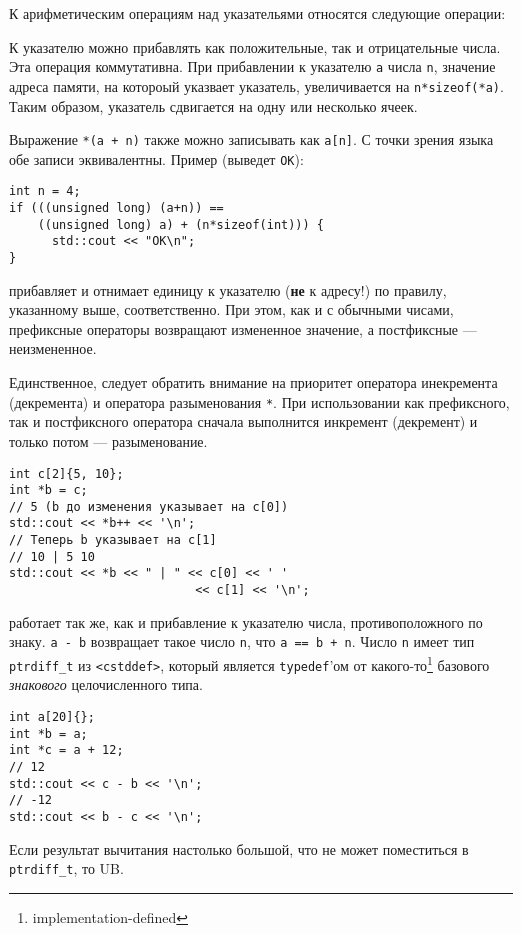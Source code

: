 \documentclass[14pt, a4paper]{extarticle}
\begin{document}
К арифметическим операциям над указательями относятся следующие операции:
\begin{enumerate}
   К указателю можно прибавлять как положительные,
  так и отрицательные числа. Эта операция коммутативна. При прибавлении к указателю
  \verb|a| числа \verb|n|, значение адреса памяти, на котороый указвает указатель,
  увеличивается на \verb|n*sizeof(*a)|. Таким образом, указатель сдвигается на одну или
  несколько ячеек.

  Выражение \verb|*(a + n)| также можно записывать как \verb|a[n]|.
  С точки зрения языка обе записи эквивалентны.
  Пример (выведет \verb|OK|):
\begin{verbatim}
int n = 4;
if (((unsigned long) (a+n)) ==
    ((unsigned long) a) + (n*sizeof(int))) {
      std::cout << "OK\n";
}
\end{verbatim}

   прибавляет и отнимает единицу к указателю (\textbf{не} к адресу!) по правилу, указанному
  выше, соответственно. При этом, как и с обычными чисами, префиксные операторы возвращают измененное
  значение, а постфиксные --- неизмененное.

  Единственное, следует обратить внимание на приоритет оператора инекремента (декремента)
  и оператора разыменования \verb|*|. При использовании как префиксного, так и постфиксного
  оператора сначала выполнится инкремент (декремент) и только потом --- разыменование.
\begin{verbatim}
int c[2]{5, 10};
int *b = c;
// 5 (b до изменения указывает на c[0])
std::cout << *b++ << '\n';
// Теперь b указывает на c[1]
// 10 | 5 10
std::cout << *b << " | " << c[0] << ' '
                          << c[1] << '\n';
\end{verbatim}

   работает так же, как и прибавление к указателю
  числа, противоположного по знаку.
   \verb|a - b| возвращает такое число \verb|n|,
  что \verb|a == b + n|. Число \verb|n| имеет тип \verb|ptrdiff_t| из \verb|<cstddef>|,
  который является \verb|typedef|'ом от какого-то\footnote{implementation-defined} базового
  \textit{знакового} целочисленного типа.
\begin{verbatim}
int a[20]{};
int *b = a;
int *c = a + 12;
// 12
std::cout << c - b << '\n';
// -12
std::cout << b - c << '\n';
\end{verbatim}
  Если результат вычитания настолько большой, что не может поместиться в \verb|ptrdiff_t|,
  то UB.
\end{enumerate}
\end{document}
